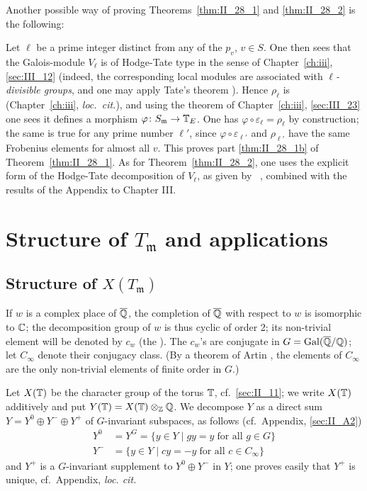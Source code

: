 \begin{obs}
Another possible way of proving Theorems~\ref{thm:II_28_1} and
\ref{thm:II_28_2} is the following:

Let $\ell$ be a prime integer distinct from any of the $p_v$, $v \in S$.  One
then sees that the Galois-module $V_\ell$ is of Hodge-Tate type in the sense of
Chapter~\ref{ch:iii}, \ref{sec:III_12} (indeed, the corresponding local modules
\dpage
are associated with \emph{$\ell$-divisible groups}, and one may apply Tate's
theorem \cite{39}).
Hence $\rho_\ell$ is  (Chapter~\ref{ch:iii},
\emph{loc.\ cit.}), and using the theorem of Chapter~\ref{ch:iii},
\ref{sec:III_23} one sees it defines a morphism $\varphi \colon
S_{\mathfrak{m}} \to \mathbb{T}_E$.
One has $\varphi\circ\varepsilon_\ell = \rho_\ell$ by construction; the same is
true for any prime number $\ell'$, since $\varphi\circ\varepsilon_{\ell'}$ and
$\rho_{\ell'}$ have the same Frobenius elements for almost all $v$.
This proves part \ref{thm:II_28_1b} of Theorem~\ref{thm:II_28_1}. As for
Theorem~\ref{thm:II_28_2}, one uses the explicit form of the Hodge-Tate
decomposition of $V_\ell$, as given by \citeauthor{39}~\cite{39}, combined with
the results of the Appendix to Chapter III.
\end{obs}

\section{Structure of \texorpdfstring{$T_{\mathfrak{m}}$}{Tm} and applications}

\subsection{Structure of \texorpdfstring{$X(T_{\mathfrak{m}})$}{X(Tm)}}
\label{sec:II_31}
If $w$ is a complex place of $\overline{\mathbb{Q}}$, the completion of $\overline{\mathbb{Q}}$ with
respect to $w$ is isomorphic to $\mathbb{C}$; the decomposition group of $w$ is
thus cyclic of order 2; its non-trivial element will be denoted by $c_w$ (the
). The $c_w$'s are conjugate in
$G = \operatorname{Gal}(\overline{\mathbb{Q}}/\mathbb{Q})$; let $C_\infty$ denote their conjugacy class. (By a
theorem of Artin \cite[257]{1}, the elements of $C_\infty$ are the only
non-trivial elements of finite order in $G$.)

Let $X(\mathbb{T})$ be the character group of the torus $\mathbb{T}$, cf.\ \ref{sec:II_11}; we
write $X(\mathbb{T})$ additively and put $Y(\mathbb{T}) = X(\mathbb{T}) \otimes_{\mathbb{Z}} \mathbb{Q}$. We decompose
$Y$ as a direct sum $Y = Y^0 \oplus Y^- \oplus Y^+$ of $G$-invariant subspaces, as
follows (cf.\ Appendix, \ref{sec:II_A2})
\begin{align*}
	Y^0 &= Y^G = \{ y \in Y \mid gy = y \; \text{for all } g\in G \} \\
	Y^- &= \{ y \in Y \mid cy = -y \; \text{for all } c\in C_\infty \}
\end{align*}
and $Y^+$ is a $G$-invariant supplement to $Y^0 \oplus Y^-$ in $Y$; one proves
\dpage
easily that $Y^+$ is unique, cf.\ Appendix, \emph{loc. cit.}

